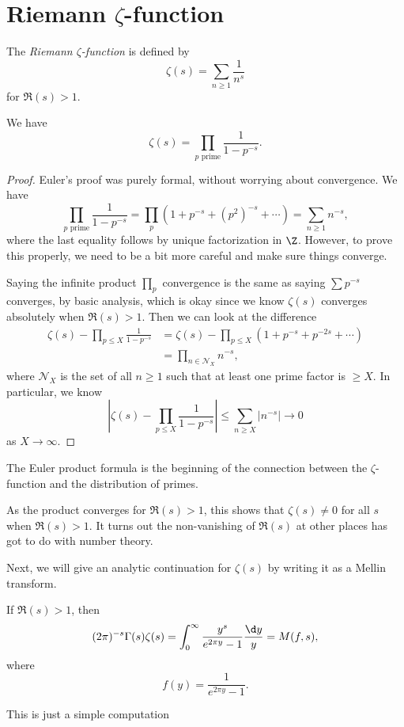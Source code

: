 \documentclass[a4paper]{article}
\begin{document}
\section{Riemann \texorpdfstring{$\zeta$}{zeta}-function}
\begin{defi}
  The \emph{Riemann $\zeta$-function} is defined by
  \[
    \zeta(s) = \sum_{n \geq 1} \frac{1}{n^s}
  \]
  for $\Re(s) > 1$.
\end{defi}

\begin{prop}
  We have
  \[
    \zeta(s) = \prod_{p \text{ prime}} \frac{1}{1 - p^{-s}}.
  \]
\end{prop}

\begin{proof}
  Euler's proof was purely formal, without worrying about convergence. We have
  \[
    \prod_{p\text{ prime}} \frac{1}{1 - p^{-s}} = \prod_p (1 + p^{-s} + (p^2)^{-s} + \cdots) = \sum_{n \geq 1} n^{-s},
  \]
  where the last equality follows by unique factorization in $\Z$. However, to prove this properly, we need to be a bit more careful and make sure things converge.

  Saying the infinite product $\prod_p$ convergence is the same as saying $\sum p^{-s}$ converges, by basic analysis, which is okay since we know $\zeta(s)$ converges absolutely when $\Re(s) > 1$. Then we can look at the difference
  \begin{align*}
    \zeta(s) - \prod_{p \leq X} \frac{1}{1 - p^{-s}} &= \zeta(s) - \prod_{p \leq X} (1 + p^{-s} + p^{-2s} + \cdots)\\
    &= \prod_{n \in \mathcal{N}_X} n^{-s},
  \end{align*}
  where $\mathcal{N}_X$ is the set of all $n \geq 1$ such that at least one prime factor is $\geq X$. In particular, we know
  \[
    \left|\zeta(s) - \prod_{p \leq X} \frac{1}{1 - p^{-s}}\right| \leq \sum_{n \geq X} |n^{-s}| \to 0
  \]
  as $X \to \infty$.
\end{proof}
The Euler product formula is the beginning of the connection between the $\zeta$-function and the distribution of primes.

As the product converges for $\Re(s) > 1$, this shows that $\zeta(s) \not= 0$ for all $s$ when $\Re(s) > 1$. It turns out the non-vanishing of $\Re(s)$ at other places has got to do with number theory.

Next, we will give an analytic continuation for $\zeta(s)$ by writing it as a Mellin transform.
\begin{thm}
  If $\Re(s) > 1$, then
  \[
    (2\pi)^{-s} \Gamma(s)  \zeta(s) = \int_0^\infty \frac{y^s}{e^{2\pi y} - 1} \frac{\d y}{y} = M(f, s),
  \]
  where
  \[
    f(y) = \frac{1}{e^{2 \pi y} - 1}.
  \]
\end{thm}
This is just a simple computation
\end{document}
